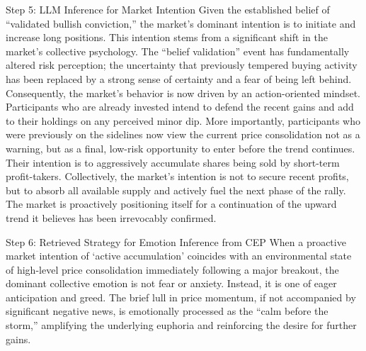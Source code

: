 \documentclass[letterpaper]{article} %
\begin{document}
\begin{forwardMainBox}{Step 5: LLM Inference for Market Intention}
    Given the established belief of ``validated bullish conviction,'' the market's dominant intention is to initiate and increase long positions.
    This intention stems from a significant shift in the market's collective psychology. The ``belief validation'' event has fundamentally altered risk perception; the uncertainty that previously tempered buying activity has been replaced by a strong sense of certainty and a fear of being left behind.
    Consequently, the market's behavior is now driven by an action-oriented mindset. Participants who are already invested intend to defend the recent gains and add to their holdings on any perceived minor dip. More importantly, participants who were previously on the sidelines now view the current price consolidation not as a warning, but as a final, low-risk opportunity to enter before the trend continues. Their intention is to aggressively accumulate shares being sold by short-term profit-takers.
    Collectively, the market's intention is not to secure recent profits, but to absorb all available supply and actively fuel the next phase of the rally. The market is proactively positioning itself for a continuation of the upward trend it believes has been irrevocably confirmed.
\end{forwardMainBox}

\begin{forwardAuxBox}{Step 6: Retrieved Strategy for Emotion Inference from CEP}
    When a proactive market intention of `active accumulation' coincides with an environmental state of high-level price consolidation immediately following a major breakout, the dominant collective emotion is not fear or anxiety. Instead, it is one of eager anticipation and greed. The brief lull in price momentum, if not accompanied by significant negative news, is emotionally processed as the ``calm before the storm,'' amplifying the underlying euphoria and reinforcing the desire for further gains.
\end{forwardAuxBox}
\end{document}
